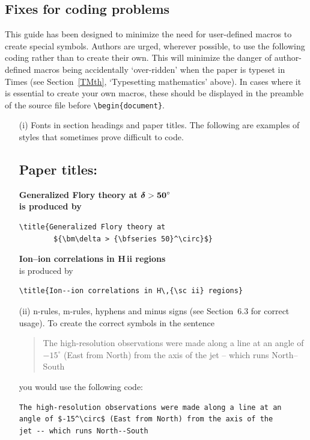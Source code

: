 \documentclass[]{cJEN2e}
\begin{document}
\subsection{Fixes for coding problems}

This guide has been designed to minimize the need for user-defined macros to  create special symbols. Authors
are urged, wherever possible, to use the following coding rather than to create their own. This will minimize
the danger of author-defined macros being accidentally  `over-ridden' when the paper is typeset in Times (see
Section~\ref{TMth}, `Typesetting mathematics' above). In cases where it is essential to create your own macros,
these should be displayed in the preamble of the source file before \verb"\begin{document}".

%
\begin{enumerate}
\item[(i)] Fonts in section headings and paper titles. The following are  examples
of styles that sometimes prove difficult to code.


\subsection*{P\lowercase{aper titles:}}

\bf{\noindent Generalized Flory theory at ${\bm\delta >
{\bf
   50}^\circ}$}\\

    \noindent\normalfont is produced by
\begin{verbatim}
\title{Generalized Flory theory at
        ${\bm\delta > {\bfseries 50}^\circ}$}
\end{verbatim}
\bigskip

{\bf{\noindent Ion--ion correlations in H\,{\sc ii} regions}}\\

\noindent\normalfont is produced by
%
\begin{verbatim}
\title{Ion--ion correlations in H\,{\sc ii} regions}
\end{verbatim}



\item[(ii)] n-rules, m-rules, hyphens and minus signs (see Section~6.3 for
correct usage). To create the correct symbols in the sentence
%
\begin{quote}
The high-resolution observations were made along a line at an
angle of $-15^\circ$ (East from North) from the axis of the
jet -- which runs North--South
\end{quote}
you would use the following code:
%
\begin{verbatim}
The high-resolution observations were made along a line at an
angle of $-15^\circ$ (East from North) from the axis of the
jet -- which runs North--South
\end{verbatim}


\end{enumerate}
\end{document}
